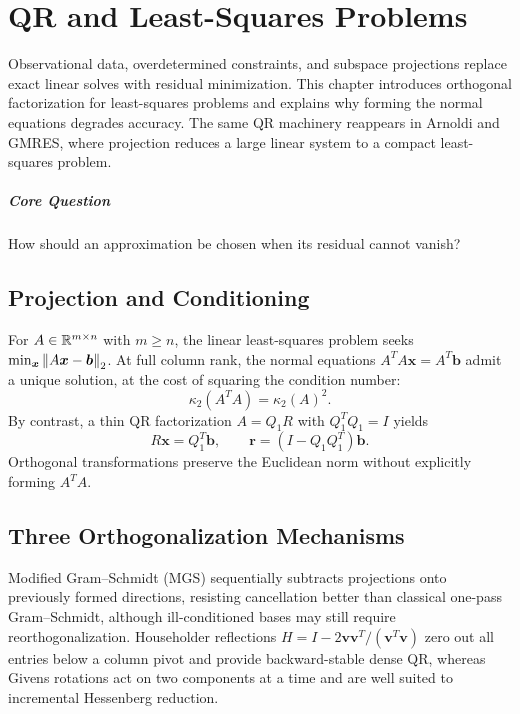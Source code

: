 \chapter{QR and Least-Squares Problems}\label{v0ch:7}
\begin{chaptersummary}
Observational data, overdetermined constraints, and subspace projections replace exact linear solves with residual minimization. This chapter introduces orthogonal factorization for least-squares problems and explains why forming the normal equations degrades accuracy. The same QR machinery reappears in Arnoldi and GMRES, where projection reduces a large linear system to a compact least-squares problem.
\end{chaptersummary}
\paragraph{Core Question}How should an approximation be chosen when its residual cannot vanish?

\section{Projection and Conditioning}
For $A\in\mathbb R^{m\times n}$ with $m\ge n$, the linear least-squares problem seeks $\min_{\bm x}\left\lVert A\bm x-\bm b\right\rVert_2$. At full column rank, the normal equations
$A^TA\bm x=A^T\bm b$ admit a unique solution, at the cost of squaring the condition number:
\[
 \kappa_2(A^TA)=\kappa_2(A)^2.
\]
By contrast, a thin QR factorization $A=Q_1R$ with $Q_1^TQ_1=I$ yields
\[
 R\bm x=Q_1^T\bm b,\qquad
 \bm r=(I-Q_1Q_1^T)\bm b.
\]
Orthogonal transformations preserve the Euclidean norm without explicitly forming $A^TA$.
\section{Three Orthogonalization Mechanisms}
Modified Gram--Schmidt (MGS) sequentially subtracts projections onto previously formed directions, resisting cancellation better than classical one-pass Gram--Schmidt, although ill-conditioned bases may still require reorthogonalization. Householder reflections $H=I-2\bm v\bm v^T/(\bm v^T\bm v)$ zero out all entries below a column pivot and provide backward-stable dense QR, whereas Givens rotations act on two components at a time and are well suited to incremental Hessenberg reduction.

